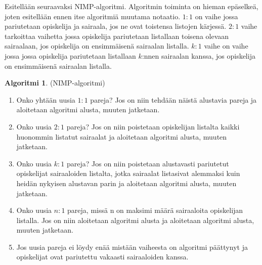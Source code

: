\documentclass[finnish]{tktltiki2}
\theoremstyle{definition}
\newtheorem{alg}[lau]{Algoritmi}
\theoremstyle{remark}
\begin{document}
Esitellään seuraavaksi NIMP-algoritmi. Algoritmin toiminta on hieman epäselkeä, joten esitellään ennen itse algoritmiä muutama notaatio. $1:1$ on vaihe jossa pariutetaan opiskelija ja sairaala, jos ne ovat toistensa listojen kärjessä. $2:1$ vaihe tarkoittaa vaihetta jossa opiskelija pariutetaan listallaan toisena olevaan sairaalaan, jos opiskelija on ensimmäisenä sairaalan listalla. $k:1$ vaihe on vaihe jossa jossa opiskelija pariutetaan listallaan $k$:nnen sairaalan kanssa, jos opiskelija on ensimmäisenä sairaalan listalla.
\begin{alg} (NIMP-algoritmi) \cite{roth84} \label{nimp}
	\begin{enumerate}
		\item Onko yhtään uusia $1:1$ pareja? Jos on niin tehdään näistä alustavia pareja ja aloitetaan algoritmi alusta, muuten jatketaan.
		\item Onko uusia $2:1$ pareja? Jos on niin poistetaan opiskelijan listalta kaikki huonommin listatut sairaalat ja aloitetaan algoritmi alusta, muuten jatketaan.
		\item Onko uusia $k:1$ pareja? Jos on niin poistetaan alustavasti pariutetut opiskelijat sairaaloiden listalta, jotka sairaalat listasivat alemmaksi kuin heidän nykyisen alustavan parin ja aloitetaan algoritmi alusta, muuten jatketaan.
		\item Onko uusia $n:1$ pareja, missä n on maksimi määrä sairaaloita opiskelijan listalla. Jos on niin aloitetaan algoritmi alusta ja aloitetaan algoritmi alusta, muuten jatketaan.
		\item Jos uusia pareja ei löydy enää mistään vaiheesta on algoritmi päättynyt ja opiskelijat ovat pariutettu vakaasti sairaaloiden kanssa.
	\end{enumerate}
\end{alg}
\end{document}
